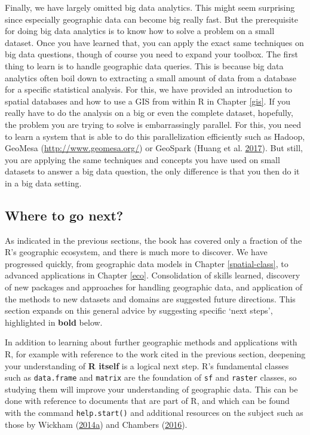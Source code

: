 \documentclass[]{krantz}
\begin{document}
Finally, we have largely omitted big data analytics.
This might seem surprising since especially geographic data can become big really fast.
But the prerequisite for doing big data analytics is to know how to solve a problem on a small dataset.
Once you have learned that, you can apply the exact same techniques on big data questions, though of course you need to expand your toolbox.
The first thing to learn is to handle geographic data queries.
This is because big data analytics often boil down to extracting a small amount of data from a database for a specific statistical analysis.
For this, we have provided an introduction to spatial databases and how to use a GIS from within R in Chapter \ref{gis}.
If you really have to do the analysis on a big or even the complete dataset, hopefully, the problem you are trying to solve is embarrassingly parallel.
For this, you need to learn a system that is able to do this parallelization efficiently such as Hadoop, GeoMesa (\url{http://www.geomesa.org/}) or GeoSpark (Huang et al. \protect\hyperlink{ref-huang_geospark_2017}{2017}).
But still, you are applying the same techniques and concepts you have used on small datasets to answer a big data question, the only difference is that you then do it in a big data setting.

\hypertarget{next}{%
\subsection{Where to go next?}\label{next}}

As indicated in the previous sections, the book has covered only a fraction of the R's geographic ecosystem, and there is much more to discover.
We have progressed quickly, from geographic data models in Chapter \ref{spatial-class}, to advanced applications in Chapter \ref{eco}.
Consolidation of skills learned, discovery of new packages and approaches for handling geographic data, and application of the methods to new datasets and domains are suggested future directions.
This section expands on this general advice by suggesting specific `next steps', highlighted in \textbf{bold} below.

In addition to learning about further geographic methods and applications with R, for example with reference to the work cited in the previous section, deepening your understanding of \textbf{R itself} is a logical next step.
R's fundamental classes such as \texttt{data.frame} and \texttt{matrix} are the foundation of \texttt{sf} and \texttt{raster} classes, so studying them will improve your understanding of geographic data.
This can be done with reference to documents that are part of R, and which can be found with the command \texttt{help.start()} and additional resources on the subject such as those by Wickham (\protect\hyperlink{ref-wickham_advanced_2014}{2014}\protect\hyperlink{ref-wickham_advanced_2014}{a}) and Chambers (\protect\hyperlink{ref-chambers_extending_2016}{2016}).
\end{document}
